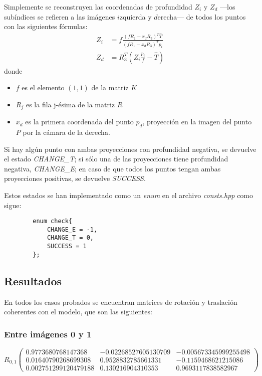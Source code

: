 \documentclass[a4paper, 11pt]{article}
\theoremstyle{definition}
\theoremstyle{theorem}
\begin{document}
    Simplemente se reconstruyen las coordenadas de profundidad $Z_i$ y $Z_d$ ---los subíndices se refieren a las imágenes $i$zquierda y $d$erecha--- de todos los puntos  con las siguientes fórmulas:
    \begin{align*}
        Z_i &= f \frac{(fR_1-x_dR_3)^T\hat{T}}{(fR_1-x_dR_3)^Tp_i} \\
        Z_d &= R_3^T(Z_i\frac{p_i}{f}-\hat{T})
    \end{align*}
    donde
    \begin{itemize}
        \item $f$ es el elemento $(1,1)$ de la matriz $K$
        \item $R_j$ es la fila j-ésima de la matriz $R$
        \item $x_d$ es la primera coordenada del punto $p_d$, proyección en la imagen del punto $P$ por la cámara de la derecha.
    \end{itemize}

    Si hay algún punto con ambas proyecciones con profundidad negativa, se devuelve el estado \emph{CHANGE\_T}; si sólo una de las proyecciones tiene profundidad negativa, \emph{CHANGE\_E}; en caso de que todos los puntos tengan ambas proyecciones positivas, se devuelve \emph{SUCCESS}.

    Estos estados se han implementado como un \emph{enum} en el archivo \emph{consts.hpp} como sigue:
    \begin{lstlisting}
        enum check{
            CHANGE_E = -1,
            CHANGE_T = 0,
            SUCCESS = 1
        };
    \end{lstlisting}

    \subsection{Resultados}
    En todos los casos probados se encuentran matrices de rotación y traslación coherentes con el modelo, que son las siguientes:

    \subsubsection*{Entre imágenes 0 y 1}
    \[
    R_{0,1}\left(
    \begin{array}{ccc}
        0.9773680768147368 & -0.02268527605130709 & -0.005673345999255498 \\
        0.01640790268699308 & 0.9528832785661331 & -0.1159468621215086 \\
        0.002751299120479188 & 0.130216904310353 & 0.9693117838582967
    \end{array}
    \right)
    \]
\end{document}
